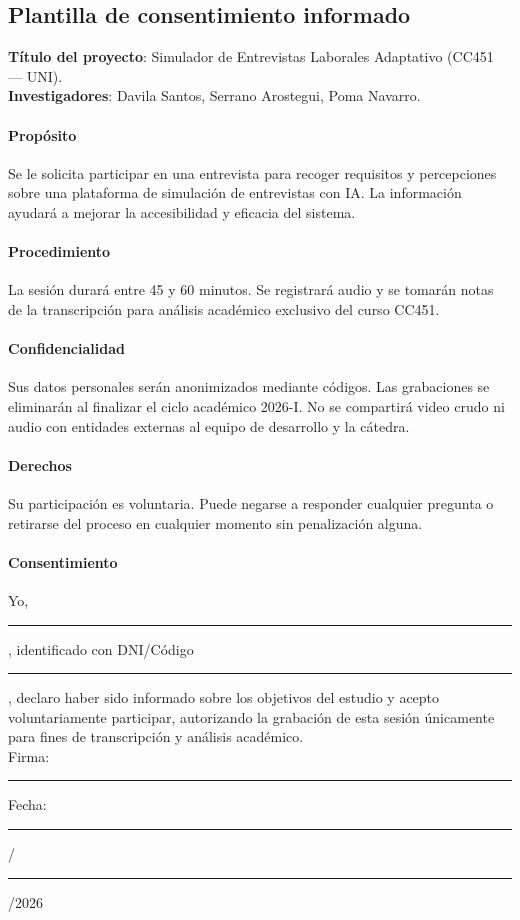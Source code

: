 \subsection{Plantilla de consentimiento informado}

\begin{cajaCriterio}
\textbf{Título del proyecto}: Simulador de Entrevistas Laborales
Adaptativo (CC451 --- UNI). \\
\textbf{Investigadores}: Davila Santos, Serrano Arostegui, Poma
Navarro.

\paragraph{Propósito} Se le solicita participar en una entrevista para
recoger requisitos y percepciones sobre una plataforma de simulación
de entrevistas con IA. La información ayudará a mejorar la
accesibilidad y eficacia del sistema.

\paragraph{Procedimiento} La sesión durará entre 45 y 60 minutos. Se
registrará audio y se tomarán notas de la transcripción para análisis
académico exclusivo del curso CC451.

\paragraph{Confidencialidad} Sus datos personales serán anonimizados
mediante códigos. Las grabaciones se eliminarán al finalizar el ciclo
académico 2026-I. No se compartirá video crudo ni audio con entidades
externas al equipo de desarrollo y la cátedra.

\paragraph{Derechos} Su participación es voluntaria. Puede negarse a
responder cualquier pregunta o retirarse del proceso en cualquier
momento sin penalización alguna.

\paragraph{Consentimiento}
Yo, \rule{6cm}{0.4pt}, identificado con DNI/Código \rule{2.5cm}{0.4pt},
declaro haber sido informado sobre los objetivos del estudio y acepto
voluntariamente participar, autorizando la grabación de esta sesión
únicamente para fines de transcripción y análisis académico. \\[0.5cm]
Firma: \rule{5cm}{0.4pt} \quad Fecha: \rule{0.6cm}{0.4pt}/\rule{0.6cm}{0.4pt}/2026
\end{cajaCriterio}

